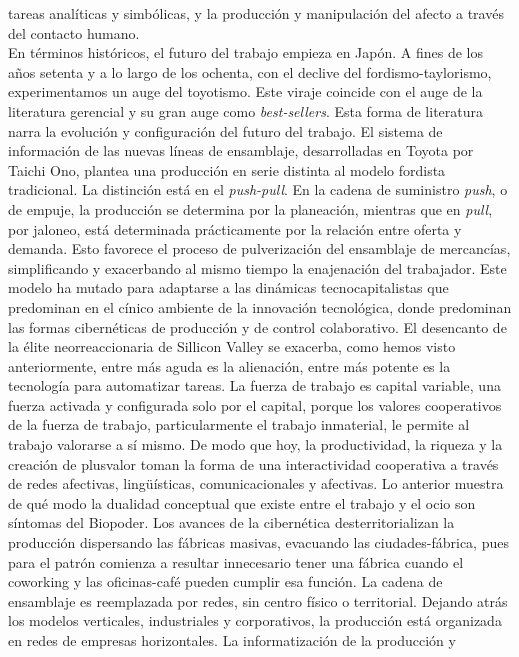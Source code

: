 \documentclass[
]{article}
\begin{document}
tareas analíticas y simbólicas, y la producción y manipulación del
afecto a través del contacto humano.\\
En términos históricos, el futuro del trabajo empieza en Japón. A fines
de los años setenta y a lo largo de los ochenta, con el declive del
fordismo-taylorismo, experimentamos un auge del toyotismo. Este viraje
coincide con el auge de la literatura gerencial y su gran auge como
\emph{best-sellers}. Esta forma de literatura narra la evolución y
configuración del futuro del trabajo. El sistema de información de las
nuevas líneas de ensamblaje, desarrolladas en Toyota por Taichi Ono,
plantea una producción en serie distinta al modelo fordista tradicional.
La distinción está en el \emph{push-pull}. En la cadena de suministro
\emph{push}, o de empuje, la producción se determina por la planeación,
mientras que en \emph{pull}, por jaloneo, está determinada prácticamente
por la relación entre oferta y demanda. Esto favorece el proceso de
pulverización del ensamblaje de mercancías, simplificando y exacerbando
al mismo tiempo la enajenación del trabajador. Este modelo ha mutado
para adaptarse a las dinámicas tecnocapitalistas que predominan en el
cínico ambiente de la innovación tecnológica, donde predominan las
formas cibernéticas de producción y de control colaborativo. El
desencanto de la élite neorreaccionaria de Sillicon Valley se exacerba,
como hemos visto anteriormente, entre más aguda es la alienación, entre
más potente es la tecnología para automatizar tareas. La fuerza de
trabajo es capital variable, una fuerza activada y configurada solo por
el capital, porque los valores cooperativos de la fuerza de trabajo,
particularmente el trabajo inmaterial, le permite al trabajo valorarse a
sí mismo. De modo que hoy, la productividad, la riqueza y la creación de
plusvalor toman la forma de una interactividad cooperativa a través de
redes afectivas, lingüísticas, comunicacionales y afectivas. Lo anterior
muestra de qué modo la dualidad conceptual que existe entre el trabajo y
el ocio son síntomas del Biopoder. Los avances de la cibernética
desterritorializan la producción dispersando las fábricas masivas,
evacuando las ciudades-fábrica, pues para el patrón comienza a resultar
innecesario tener una fábrica cuando el coworking y las oficinas-café
pueden cumplir esa función. La cadena de ensamblaje es reemplazada por
redes, sin centro físico o territorial. Dejando atrás los modelos
verticales, industriales y corporativos, la producción está organizada
en redes de empresas horizontales. La informatización de la producción y
\end{document}
